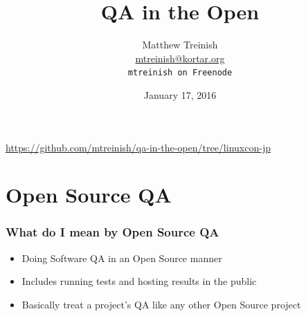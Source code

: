 \documentclass[aspectratio=43,11pt,hyperref={colorlinks=true}]{beamer}
\author[Matthew Treinish]{%
    \texorpdfstring{%
        \centering
        Matthew Treinish\\
        \href{mailto:mtreinish@kortar.org}{mtreinish@kortar.org}\\
        \texttt{mtreinish on Freenode}
   }
   {Matthew Treinish}
}
\date{January 17, 2016}
\title[QA in the Open
\hspace{2em}\insertframenumber/\inserttotalframenumber]{QA in the Open}
\begin{document}
{%
\begin{frame}[noframenumbering]
    \hypersetup{colorlinks,urlcolor=white}
    \titlepage{}
    \centering
    \href{https://github.com/mtreinish/qa-in-the-open/tree/linuxcon-jp}{https://github.com/mtreinish/qa-in-the-open/tree/linuxcon-jp}
\end{frame}
}

\section{Open Source QA}
\begin{frame}
    \frametitle{What do I mean by Open Source QA}
    \begin{itemize}
        \item Doing Software QA in an Open Source manner
        \item Includes running tests and hosting results in the public
        \item Basically treat a project's QA like any other Open Source project
    \end{itemize}
\end{frame}
\end{document}
